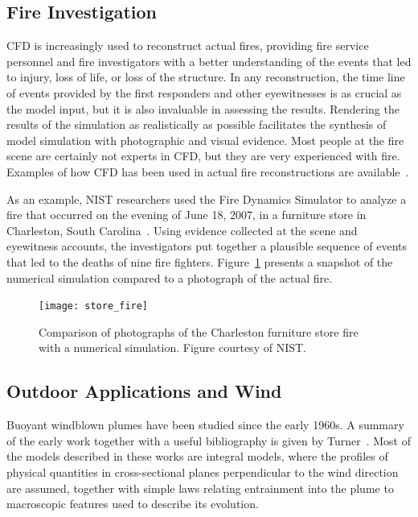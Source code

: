 \documentclass[graybox]{svmult}
\begin{document}
\subsection{Fire Investigation}

CFD is increasingly used to reconstruct  actual  fires,  providing  fire  service  personnel and fire investigators with a better understanding of the events that led to injury, loss of life, or loss of the structure. In any reconstruction, the time line of events provided by the first responders and other eyewitnesses is as crucial as the model input, but it is also invaluable in assessing the results. Rendering the results of the simulation as realistically as possible facilitates the synthesis of model simulation with photographic and visual evidence. Most people at the fire scene are certainly not experts in CFD, but they are very experienced with fire. Examples of how CFD has been used in actual fire reconstructions are available~\cite{Grosshandler, McGrattan:2005, Madrzykowski:2000, Madrzykowski:2004, Christensen}.

As an example, NIST researchers used the Fire Dynamics Simulator to analyze a fire that occurred on the evening of June 18, 2007, in a furniture store in Charleston, South Carolina~\cite{Bryner:2011}. Using evidence collected at the scene and eyewitness accounts, the investigators put together a plausible sequence of events that led to the deaths of nine fire fighters. Figure~\ref{furniture_store} presents a snapshot of the numerical simulation compared to a photograph of the actual fire.
\begin{figure}[ht]
\texttt{[image: store\_fire]}
\caption{Comparison of photographs of the Charleston furniture store fire with a numerical simulation. Figure courtesy of NIST.}
\label{furniture_store}
\end{figure}



\subsection{Outdoor Applications and Wind}

Buoyant windblown plumes have been studied since the early 1960s. A summary of the early work together with a useful bibliography is given by Turner~\cite{Turner}. Most of the models described in these works are integral models, where the profiles of physical quantities in cross-sectional planes perpendicular to the wind direction are assumed, together with simple laws relating entrainment into the plume to macroscopic features used to describe its evolution.
\end{document}
